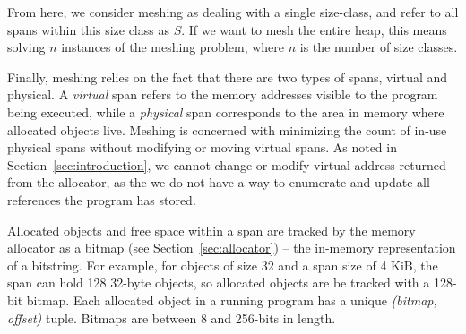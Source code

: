 From here, we consider meshing as dealing with a single size-class,
and refer to all spans within this size class as $S$.  If we want to
mesh the entire heap, this means solving $n$ instances of the meshing
problem, where $n$ is the number of size classes.

Finally, meshing relies on the fact that there are two types of spans,
virtual and physical.  A \textit{virtual} span refers to the memory
addresses visible to the program being executed, while a
\textit{physical} span corresponds to the area in memory where
allocated objects live.  Meshing is concerned with minimizing the
count of in-use physical spans without modifying or moving virtual
spans.  As noted in Section~\ref{sec:introduction}, we cannot change
or modify virtual address returned from the allocator, as the we do
not have a way to enumerate and update all references the program has
stored.

Allocated objects and free space within a span are tracked by the
memory allocator as a bitmap (see Section~\ref{sec:allocator}) -- the
in-memory representation of a bitstring.  For example, for objects of
size 32 and a span size of 4 KiB, the span can hold 128 32-byte
objects, so allocated objects are be tracked with a 128-bit bitmap.
Each allocated object in a running program has a unique
\textit{(bitmap, offset)} tuple.  Bitmaps are between 8 and 256-bits
in length.
